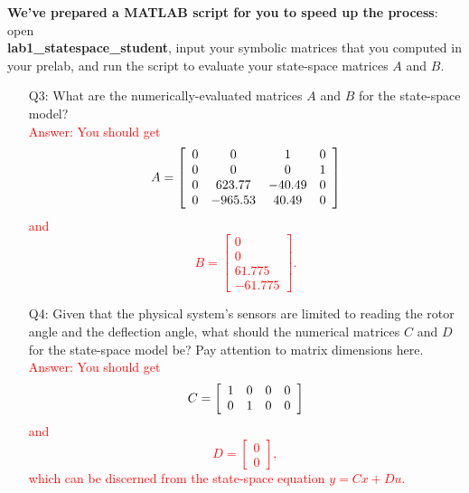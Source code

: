 \documentclass[12pt]{report}
\newcommand\drew[1]{\textcolor{red}{#1}}
\begin{document}
\textbf{We've prepared a MATLAB script for you to speed up the process}: open \\
\textbf{lab1\_statespace\_student}, input your symbolic matrices that you computed in your prelab, and run the script to evaluate your state-space matrices $A$ and $B$.
\begin{enumerate}[Question]
    \item[Q3:] What are the numerically-evaluated matrices $A$ and $B$ for the state-space model?\\
          \drew{Answer: You should get
              \[
                  A =
                  \left[\begin{array}{c c c c}
                          0 & 0       & 1      & 0 \\
                          0 & 0       & 0      & 1 \\
                          0 & 623.77  & -40.49 & 0 \\
                          0 & -965.53 & 40.49  & 0
                      \end{array}\right]
              \]
              and
              \[
                  B =
                  \left[\begin{array}{c}
                          0      \\
                          0      \\
                          61.775 \\
                          -61.775
                      \end{array}\right].
              \]
          }
    \item[Q4:] Given that the physical system's sensors are limited to reading the rotor angle and the deflection angle, what should the numerical matrices $C$ and $D$ for the state-space model be? Pay attention to matrix dimensions here.\\
          \drew{Answer: You should get
              \[
                  C =
                  \left[\begin{array}{c c c c}
                          1 & 0 & 0 & 0 \\
                          0 & 1 & 0 & 0
                      \end{array}\right]
              \]
              and
              \[
                  D =
                  \left[\begin{array}{c}
                          0 \\
                          0
                      \end{array}\right],
              \]
              which can be discerned from the state-space equation $y = Cx + Du$.
          }
\end{enumerate}
\end{document}
